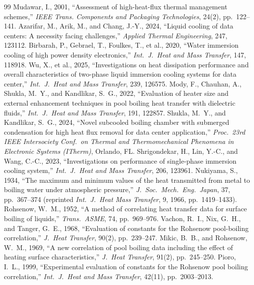 \documentclass[11pt]{article}
\begin{document}
\clearpage
\begin{thebibliography}{99}
\small
 Mudawar, I., 2001, ``Assessment of high-heat-flux thermal management schemes,'' \textit{IEEE Trans. Components and Packaging Technologies}, 24(2), pp.~122--141.
 Azarifar, M., Arik, M., and Chang, J.-Y., 2024, ``Liquid cooling of data centers: A necessity facing challenges,'' \textit{Applied Thermal Engineering}, 247, 123112.
 Birbarah, P., Gebrael, T., Foulkes, T., et al., 2020, ``Water immersion cooling of high power density electronics,'' \textit{Int.\ J.\ Heat and Mass Transfer}, 147, 118918.
 Wu, X., et al., 2025, ``Investigations on heat dissipation performance and overall characteristics of two-phase liquid immersion cooling systems for data center,'' \textit{Int.\ J.\ Heat and Mass Transfer}, 239, 126575.
 Mody, F., Chauhan, A., Shukla, M.~Y., and Kandlikar, S.~G., 2022, ``Evaluation of heater size and external enhancement techniques in pool boiling heat transfer with dielectric fluids,'' \textit{Int.\ J.\ Heat and Mass Transfer}, 191, 122857.
 Shukla, M.~Y., and Kandlikar, S.~G., 2024, ``Novel subcooled boiling chamber with submerged condensation for high heat flux removal for data center application,'' \textit{Proc.\ 23rd IEEE Intersociety Conf.\ on Thermal and Thermomechanical Phenomena in Electronic Systems (ITherm)}, Orlando, FL.
 Shrigondekar, H., Lin, Y.-C., and Wang, C.-C., 2023, ``Investigations on performance of single-phase immersion cooling system,'' \textit{Int.\ J.\ Heat and Mass Transfer}, 206, 123961.
 Nukiyama, S., 1934, ``The maximum and minimum values of the heat transmitted from metal to boiling water under atmospheric pressure,'' \textit{J.\ Soc.\ Mech.\ Eng.\ Japan}, 37, pp.~367--374 (reprinted \textit{Int.\ J.\ Heat Mass Transfer}, 9, 1966, pp.~1419--1433).
 Rohsenow, W.~M., 1952, ``A method of correlating heat transfer data for surface boiling of liquids,'' \textit{Trans.\ ASME}, 74, pp.~969--976.
 Vachon, R.~I., Nix, G.~H., and Tanger, G.~E., 1968, ``Evaluation of constants for the Rohsenow pool-boiling correlation,'' \textit{J.\ Heat Transfer}, 90(2), pp.~239--247.
 Mikic, B.~B., and Rohsenow, W.~M., 1969, ``A new correlation of pool boiling data including the effect of heating surface characteristics,'' \textit{J.\ Heat Transfer}, 91(2), pp.~245--250.
 Pioro, I.~L., 1999, ``Experimental evaluation of constants for the Rohsenow pool boiling correlation,'' \textit{Int.\ J.\ Heat and Mass Transfer}, 42(11), pp.~2003--2013.

\end{thebibliography}
\end{document}

